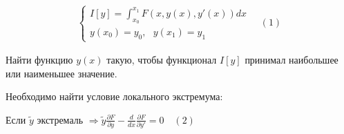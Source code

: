 \documentclass[12pt, a4paper]{report}
\begin{document}
\fi


\[ \begin{aligned}
\begin{cases}
    \displaystyle I[y] = \int_{x_0}^{x_1} F(x,y(x),y'(x))dx \\
    y(x_0)=y_0, \text{ } y(x_1)=y_1
\end{cases}
\quad (1)
\end{aligned} \] 

Найти функцию \( y(x) \)   такую, чтобы функционал \( I[y] \) принимал наибольшее или наименьшее значение. 

Необходимо найти условие локального экстремума: 

Если \( \tilde{y }       \)  экстремаль \( \Rightarrow \tilde{y }  \frac{\partial F }{\partial y} - \frac{d}{dx }  \frac{\partial F}{\partial y '} = 0 \quad (2)   \)
\end{document}
